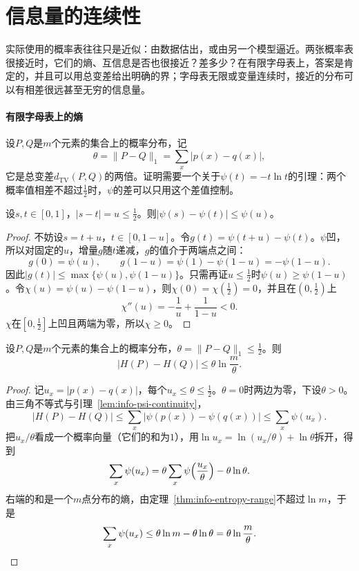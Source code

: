 \section{信息量的连续性}
\label{sec:info-continuity}

实际使用的概率表往往只是近似：由数据估出，或由另一个模型逼近。两张概率表很接近时，它们的熵、互信息是否也很接近？差多少？在有限字母表上，答案是肯定的，并且可以用总变差给出明确的界；字母表无限或变量连续时，接近的分布可以有相差很远甚至无穷的信息量。

\paragraph{有限字母表上的熵}
设$P,Q$是$m$个元素的集合上的概率分布，记
\[
  \theta=\lVert P-Q\rVert_1=\sum_x\lvert p(x)-q(x)\rvert,
\]
它是总变差$d_{\mathrm{TV}}(P,Q)$的两倍。证明需要一个关于$\psi(t)=-t\ln t$的引理：两个概率值相差不超过$\tfrac12$时，$\psi$的差可以只用这个差值控制。

\begin{lemma}[单项的连续性]
\label{lem:info-psi-continuity}
设$s,t\in[0,1]$，$\lvert s-t\rvert=u\leq\tfrac12$。则$\lvert\psi(s)-\psi(t)\rvert\leq\psi(u)$。
\end{lemma}

\begin{proof}
不妨设$s=t+u$，$t\in[0,1-u]$。令$g(t)=\psi(t+u)-\psi(t)$。$\psi$凹，所以对固定的$u$，增量$g$随$t$递减，$g$的值介于两端点之间：
\[
  g(0)=\psi(u),\qquad g(1-u)=\psi(1)-\psi(1-u)=-\psi(1-u).
\]
因此$\lvert g(t)\rvert\leq\max\{\psi(u),\psi(1-u)\}$。只需再证$u\leq\tfrac12$时$\psi(u)\geq\psi(1-u)$。令$\chi(u)=\psi(u)-\psi(1-u)$，则$\chi(0)=\chi(\tfrac12)=0$，并且在$(0,\tfrac12)$上
\[
  \chi''(u)=-\frac1u+\frac{1}{1-u}<0.
\]
$\chi$在$[0,\tfrac12]$上凹且两端为零，所以$\chi\geq0$。
\end{proof}

\begin{theorem}[熵的连续性]
\label{thm:info-entropy-continuity}
设$P,Q$是$m$个元素的集合上的概率分布，$\theta=\lVert P-Q\rVert_1\leq\tfrac12$。则
\begin{equation}
  \lvert H(P)-H(Q)\rvert\leq\theta\ln\frac{m}{\theta}.
  \label{eq:info-entropy-continuity}
\end{equation}
\end{theorem}

\begin{proof}
记$u_x=\lvert p(x)-q(x)\rvert$，每个$u_x\leq\theta\leq\tfrac12$。$\theta=0$时两边为零，下设$\theta>0$。由三角不等式与引理~\ref{lem:info-psi-continuity}，
\[
  \lvert H(P)-H(Q)\rvert\leq\sum_x\lvert\psi(p(x))-\psi(q(x))\rvert\leq\sum_x\psi(u_x).
\]
把$u_x/\theta$看成一个概率向量（它们的和为$1$），用$\ln u_x=\ln(u_x/\theta)+\ln\theta$拆开，得到
\[
  \sum_x\psi(u_x)=\theta\sum_x\psi\Bigl(\frac{u_x}{\theta}\Bigr)-\theta\ln\theta.
\]
右端的和是一个$m$点分布的熵，由定理~\ref{thm:info-entropy-range}不超过$\ln m$，于是
\[
  \sum_x\psi(u_x)\leq\theta\ln m-\theta\ln\theta=\theta\ln\frac{m}{\theta}.\qedhere
\]
\end{proof}

